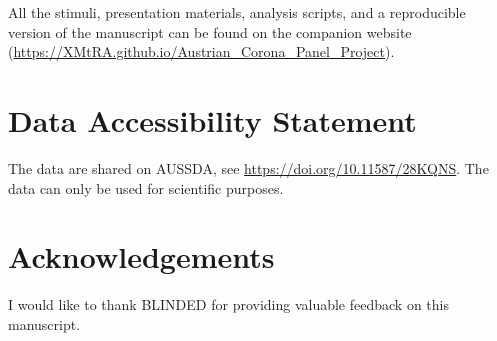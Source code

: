 \documentclass[
  man,mask,floatsintext]{apa7}
\begin{document}
All the stimuli, presentation materials, analysis scripts, and a reproducible version of the manuscript can be found on the companion website (\url{https://XMtRA.github.io/Austrian_Corona_Panel_Project}).

\hypertarget{data-accessibility-statement}{%
\section{Data Accessibility Statement}\label{data-accessibility-statement}}

The data are shared on AUSSDA, see \url{https://doi.org/10.11587/28KQNS}.
The data can only be used for scientific purposes.

\hypertarget{acknowledgements}{%
\section{Acknowledgements}\label{acknowledgements}}

I would like to thank BLINDED for providing valuable feedback on this manuscript.
\end{document}
